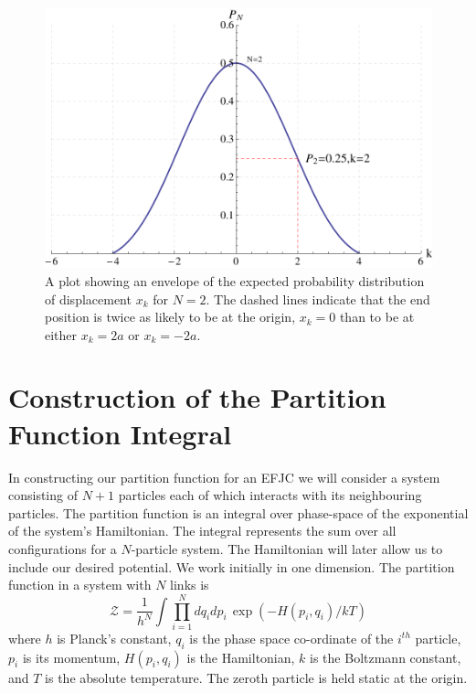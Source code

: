 \begin{figure}[H]
\centering \includegraphics[scale=0.6]{Graphics/ExpectedProbabilityDistributionN2.pdf}
\caption{A plot showing an envelope of the expected probability distribution of displacement $x_{k}$ for $N=2$.
The dashed lines indicate that the end position is twice as likely to be at the origin, $x_{k}=0$ than to be at either $x_{k}=2a$ or $x_{k}=-2a$.}
\label{fig:ProbabilityDistributionN2} 
\end{figure}


\section{Construction of the Partition Function Integral}

In constructing our partition function for an EFJC we will consider a system consisting of $N+1$ particles each of which interacts with its neighbouring particles. The partition function is an integral over phase-space of the exponential of the system's Hamiltonian. The integral represents the sum over all configurations for a $N$-particle system. The Hamiltonian will later allow us to include our desired potential. We work initially in one dimension. The partition function in a system with $N$ links is 
%
\begin{equation}
\mathcal{Z}=\frac{1}{h^{N}}\int\prod_{i=1}^{N}dq_{i}dp_{i}\,\exp\left(-H\left(p_{i},q_{i}\right)/kT\right)\label{ClassicalPartitionFunction}
\end{equation}
%
where $h$ is Planck's constant, $q_{i}$ is the phase space co-ordinate of the $i^{th}$ particle, $p_{i}$ is its momentum, $H\left(p_{i},q_{i}\right)$ is the Hamiltonian, $k$ is the Boltzmann constant, and $T$ is the absolute temperature. The zeroth particle is held static at the origin.

